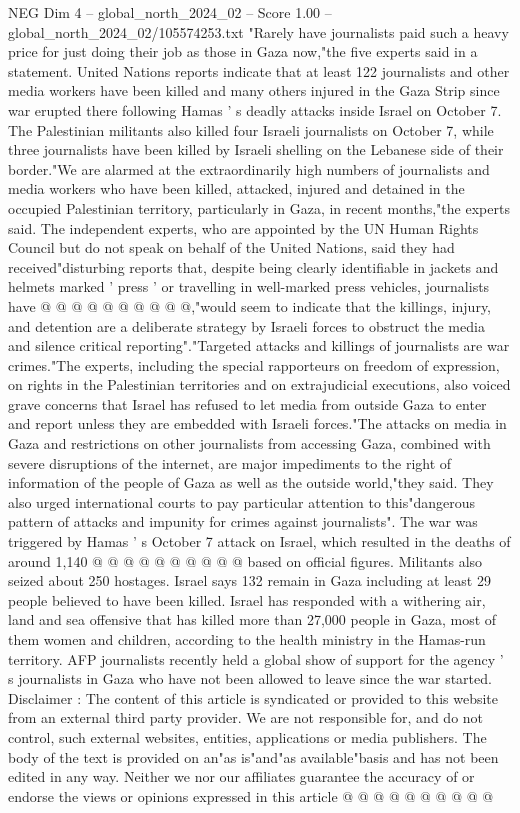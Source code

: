 \begin{textsample}{NEG Dim 4 – global\_north\_2024\_02 – Score 1.00 – global\_north\_2024\_02/105574253.txt}  \label{ex:f4_neg_283}
"Rarely have journalists paid such a heavy price for just doing their job as those in Gaza now,"the five experts said in a statement.
United Nations reports indicate that at least 122 journalists and other media workers have been killed and many others injured in the Gaza Strip since war erupted there following Hamas ' s deadly attacks inside Israel on October 7.
The Palestinian militants also killed four Israeli journalists on October 7, while three journalists have been killed by Israeli shelling on the Lebanese side of their border."We are alarmed at the extraordinarily high numbers of journalists and media workers who have been killed, attacked, injured and detained in the occupied Palestinian territory, particularly in Gaza, in recent months,"the experts said.
The independent experts, who are appointed by the UN Human Rights Council but do not speak on behalf of the United Nations, said they had received"disturbing reports that, despite being clearly identifiable in jackets and helmets marked ' press ' or travelling in well-marked press vehicles, journalists have @ @ @ @ @ @ @ @ @ @,"would seem to indicate that the killings, injury, and detention are a deliberate strategy by Israeli forces to obstruct the media and silence critical reporting"."Targeted attacks and killings of journalists are war crimes."The experts, including the special rapporteurs on freedom of expression, on rights in the Palestinian territories and on extrajudicial executions, also voiced grave concerns that Israel has refused to let media from outside Gaza to enter and report unless they are embedded with Israeli forces."The attacks on media in Gaza and restrictions on other journalists from accessing Gaza, combined with severe disruptions of the internet, are major impediments to the right of information of the people of Gaza as well as the outside world,"they said.
They also urged international courts to pay particular attention to this"dangerous pattern of attacks and impunity for crimes against journalists".
The war was triggered by Hamas ' s October 7 attack on Israel, which resulted in the deaths of around 1,140 @ @ @ @ @ @ @ @ @ @ based on official figures.
Militants also seized about 250 hostages.
Israel says 132 remain in Gaza including at least 29 people believed to have been killed.
Israel has responded with a withering air, land and sea offensive that has killed more than 27,000 people in Gaza, most of them women and children, according to the health ministry in the Hamas-run territory.
AFP journalists recently held a global show of support for the agency ' s journalists in Gaza who have not been allowed to leave since the war started.
Disclaimer : The content of this article is syndicated or provided to this website from an external third party provider.
We are not responsible for, and do not control, such external websites, entities, applications or media publishers.
The body of the text is provided on an"as is"and"as available"basis and has not been edited in any way.
Neither we nor our affiliates guarantee the accuracy of or endorse the views or opinions expressed in this article @ @ @ @ @ @ @ @ @ @

\end{textsample}
